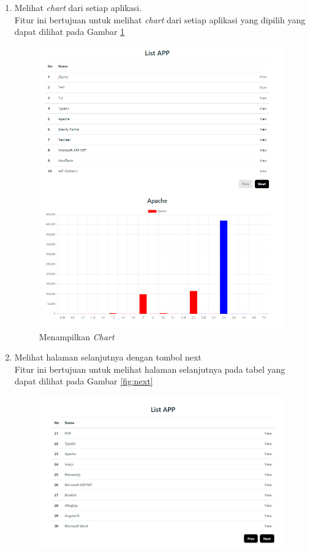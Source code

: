 \begin{enumerate}
	\item Melihat \textit{chart} dari setiap aplikasi.\\
	Fitur ini bertujuan untuk melihat \textit{chart} dari setiap aplikasi yang dipilih yang dapat dilihat pada Gambar \ref{fig:show_chart}
	\begin{figure}[H]
		\centering  
		\includegraphics[scale=0.7]{Gambar/pengujian1.png}  
		\caption{Menampilkan \textit{Chart}} 
		\label{fig:show_chart} 
	\end{figure}
	\item Melihat halaman selanjutnya dengan tombol next\\
	Fitur ini bertujuan untuk melihat halaman selanjutnya pada tabel yang dapat dilihat pada Gambar \ref{fig:next}
	\begin{figure}[H]
		\centering  
		\includegraphics[scale=0.5]{Gambar/pengujian2.png}  

\end{figure}
\end{enumerate}
